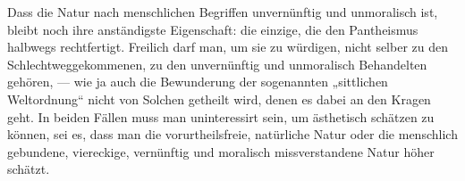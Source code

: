 Dass die Natur nach menschlichen Begriffen unvernünftig und unmoralisch ist, bleibt noch ihre anständigste Eigenschaft: die einzige, die den Pantheismus halbwegs rechtfertigt. Freilich darf man, um sie zu würdigen, nicht selber zu den Schlechtweggekommenen, zu den  unvernünftig und unmoralisch Behandelten gehören, — wie ja auch die Bewunderung der sogenannten „sittlichen Weltordnung“ nicht von Solchen getheilt wird, denen es dabei an den Kragen geht. In beiden Fällen muss man uninteressirt sein, um ästhetisch schätzen zu können, sei es, dass man die vorurtheilsfreie, natürliche Natur oder die menschlich gebundene, viereckige, vernünftig und moralisch missverstandene Natur höher schätzt.
\par

